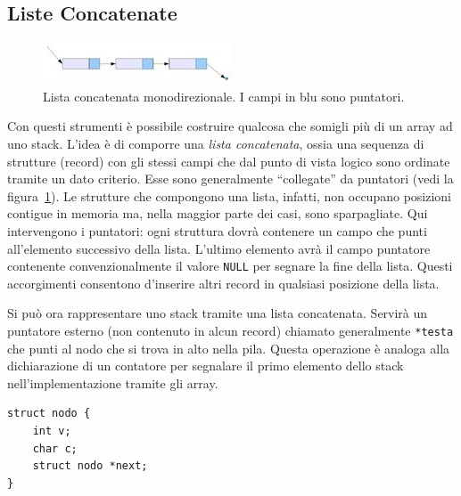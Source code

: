 		\subsection{Liste Concatenate}
		\label{subsec:liste}
\begin{figure}
	\centering
	\includegraphics[width=0.4\columnwidth]{immagini/lista}
	\caption[Lista concatenata monodirezionale]{Lista concatenata monodirezionale. I campi in blu sono puntatori.}
	\label{fig:mlist}
\end{figure}
Con questi strumenti è possibile costruire qualcosa che somigli più di un array ad uno stack.
L'idea è di comporre una \emph{lista concatenata}, ossia una sequenza di strutture (record) con gli stessi campi che dal punto di vista logico sono ordinate tramite un dato criterio.
Esse sono generalmente ``collegate'' da puntatori (vedi la figura~\ref{fig:mlist}).
Le strutture che compongono una lista, infatti, non occupano posizioni contigue in memoria ma, nella maggior parte dei casi, sono sparpagliate.
Qui intervengono i puntatori: ogni struttura dovrà contenere un campo che punti all'elemento successivo della lista.
L'ultimo elemento avrà il campo puntatore contenente convenzionalmente il valore \lstinline!NULL! per segnare la fine della lista.
Questi accorgimenti consentono d'inserire altri record in qualsiasi posizione della lista.

Si può ora rappresentare uno stack tramite una lista concatenata.
Servirà un puntatore esterno (non contenuto in alcun record) chiamato generalmente \lstinline!*testa! che punti al nodo che si trova in alto nella pila.
Questa operazione è analoga alla dichiarazione di un contatore per segnalare il primo elemento dello stack nell'implementazione tramite gli array.
\begin{lstlisting}
struct nodo {
	int v;
	char c;
	struct nodo *next;
}
\end{lstlisting}